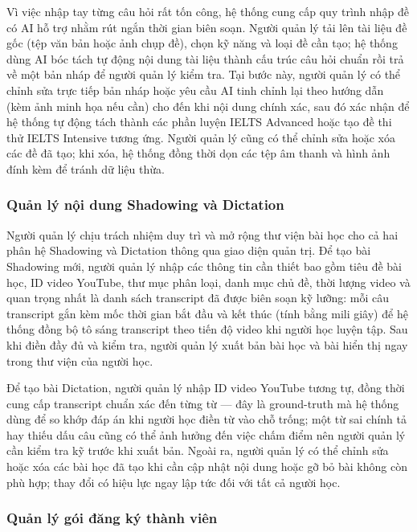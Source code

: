 Vì việc nhập tay từng câu hỏi rất tốn công, hệ thống cung cấp quy trình nhập đề có AI hỗ trợ nhằm rút ngắn thời gian biên soạn. Người quản lý tải lên tài liệu đề gốc (tệp văn bản hoặc ảnh chụp đề), chọn kỹ năng và loại đề cần tạo; hệ thống dùng AI bóc tách tự động nội dung tài liệu thành cấu trúc câu hỏi chuẩn rồi trả về một bản nháp để người quản lý kiểm tra. Tại bước này, người quản lý có thể chỉnh sửa trực tiếp bản nháp hoặc yêu cầu AI tinh chỉnh lại theo hướng dẫn (kèm ảnh minh họa nếu cần) cho đến khi nội dung chính xác, sau đó xác nhận để hệ thống tự động tách thành các phần luyện IELTS Advanced hoặc tạo đề thi thử IELTS Intensive tương ứng. Người quản lý cũng có thể chỉnh sửa hoặc xóa các đề đã tạo; khi xóa, hệ thống đồng thời dọn các tệp âm thanh và hình ảnh đính kèm để tránh dữ liệu thừa.

\subsubsection{Quản lý nội dung Shadowing và Dictation}

Người quản lý chịu trách nhiệm duy trì và mở rộng thư viện bài học cho cả hai phân hệ Shadowing và Dictation thông qua giao diện quản trị. Để tạo bài Shadowing mới, người quản lý nhập các thông tin cần thiết bao gồm tiêu đề bài học, ID video YouTube, thư mục phân loại, danh mục chủ đề, thời lượng video và quan trọng nhất là danh sách transcript đã được biên soạn kỹ lưỡng: mỗi câu transcript gắn kèm mốc thời gian bắt đầu và kết thúc (tính bằng mili giây) để hệ thống đồng bộ tô sáng transcript theo tiến độ video khi người học luyện tập. Sau khi điền đầy đủ và kiểm tra, người quản lý xuất bản bài học và bài hiển thị ngay trong thư viện của người học.

Để tạo bài Dictation, người quản lý nhập ID video YouTube tương tự, đồng thời cung cấp transcript chuẩn xác đến từng từ --- đây là ground-truth mà hệ thống dùng để so khớp đáp án khi người học điền từ vào chỗ trống; một từ sai chính tả hay thiếu dấu câu cũng có thể ảnh hưởng đến việc chấm điểm nên người quản lý cần kiểm tra kỹ trước khi xuất bản. Ngoài ra, người quản lý có thể chỉnh sửa hoặc xóa các bài học đã tạo khi cần cập nhật nội dung hoặc gỡ bỏ bài không còn phù hợp; thay đổi có hiệu lực ngay lập tức đối với tất cả người học.

\subsubsection{Quản lý gói đăng ký thành viên}

